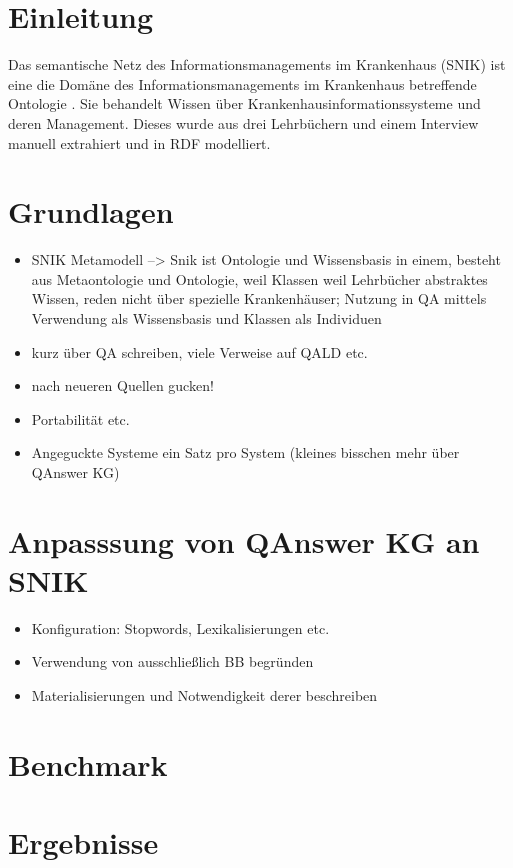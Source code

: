\documentclass[utf8,biblatex]{lni}
\begin{document}
%

\section{Einleitung}

Das semantische Netz des Informationsmanagements im Krankenhaus (SNIK) ist eine
die Domäne des Informationsmanagements im Krankenhaus betreffende Ontologie \cite{domaene}.
Sie behandelt Wissen über Krankenhausinformationssysteme und deren Management.
Dieses wurde aus drei Lehrbüchern \cite{bb,ob,he} und einem Interview \cite{ciosurvey} manuell extrahiert und in RDF modelliert.

\section{Grundlagen}
\begin{itemize}
  \item SNIK Metamodell --> Snik ist Ontologie und Wissensbasis in einem, besteht aus Metaontologie und Ontologie, weil Klassen weil Lehrbücher abstraktes Wissen, reden nicht über spezielle Krankenhäuser; Nutzung in QA mittels Verwendung als Wissensbasis und Klassen als Individuen
  \item kurz über QA schreiben, viele Verweise auf QALD etc.
  \item nach neueren Quellen gucken!
  \item Portabilität etc. 
  \item Angeguckte Systeme ein Satz pro System (kleines bisschen mehr über QAnswer KG)
\end{itemize}

\section{Anpasssung von QAnswer KG an SNIK}
\begin{itemize}
  \item Konfiguration: Stopwords, Lexikalisierungen etc.
  \item Verwendung von ausschließlich BB begründen
  \item Materialisierungen und Notwendigkeit derer beschreiben
\end{itemize}

\section{Benchmark}

\section{Ergebnisse}
\end{document}
